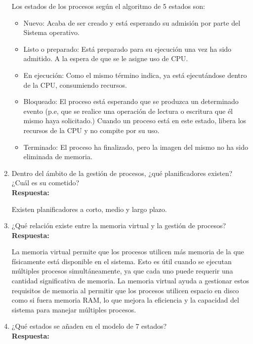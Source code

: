 \documentclass[a4paper,12pt]{article}
\begin{document}
\begin{enumerate}[label=\textbf{Pregunta \arabic*.}]
    Los estados de los procesos según el algoritmo de 5 estados son:

    \begin{itemize}
    
    \item Nuevo: Acaba de ser creado y está esperando su admisión por parte del Sistema operativo.

    \item Listo o preparado: Está preparado para su ejecución una vez ha sido admitido. A la espera de que se le asigne uso de CPU.

    \item En ejecución: Como el mismo término indica, ya está ejecutándose dentro de la CPU, consumiendo recursos. 

    \item Bloqueado: El proceso está esperando que se produzca un determinado evento (p.e, que se realice una operación de lectura o escritura que él mismo haya solicitado.) Cuando un proceso está en este estado, libera los recursos de la CPU y no compite por su uso.

    \item Terminado: El proceso ha finalizado, pero la imagen del mismo no ha sido eliminada de memoria.

    \end{itemize}

    \item Dentro del ámbito de la gestión de procesos, ¿qué planificadores existen? ¿Cuál es su cometido? \\ %
    \textbf{Respuesta:} 
    
    Existen planificadores a corto, medio y largo plazo.


    \item ¿Qué relación existe entre la memoria virtual y la gestión de procesos? \\ %
    \textbf{Respuesta:} 

    La memoria virtual permite que los procesos utilicen más memoria de la que físicamente está disponible en el sistema. Esto es útil cuando se ejecutan múltiples procesos simultáneamente, ya que cada uno puede requerir una cantidad significativa de memoria. La memoria virtual ayuda a gestionar estos requisitos de memoria al permitir que los procesos utilicen espacio en disco como si fuera memoria RAM, lo que mejora la eficiencia y la capacidad del sistema para manejar múltiples procesos. 
    
    \item ¿Qué estados se añaden en el modelo de 7 estados? \\ %
    \textbf{Respuesta:}
    

\end{enumerate}
\end{document}
